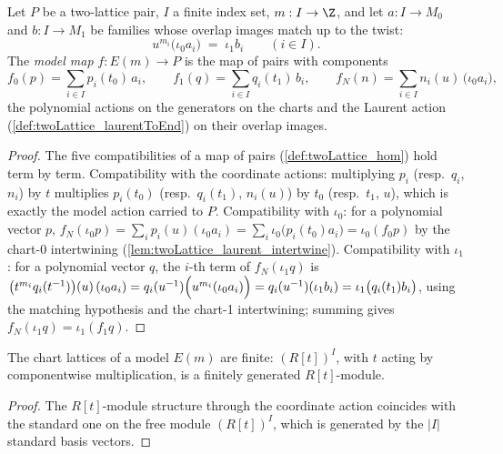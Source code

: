 \begin{definition}
  \label{def:twoLattice_modelHom}
  \leanok
  Let \(P\) be a two-lattice pair, \(I\) a finite index set, \(m : I \to \Z\), and let
  \(a : I \to M_0\) and \(b : I \to M_1\) be families whose overlap images match up to
  the twist:
  \[
    u^{m_i}\bigl(\iota_0 a_i\bigr) \;=\; \iota_1 b_i \qquad (i \in I).
  \]
  The \emph{model map} \(f : E(m) \to P\) is the map of pairs with components
  \[
    f_0(p) = \sum_{i \in I} p_i(t_0)\, a_i, \qquad
    f_1(q) = \sum_{i \in I} q_i(t_1)\, b_i, \qquad
    f_N(n) = \sum_{i \in I} n_i(u)\, \bigl(\iota_0 a_i\bigr) ,
  \]
  the polynomial actions on the generators on the charts and the Laurent action
  (\ref{def:twoLattice_laurentToEnd}) on their overlap images.
\end{definition}
\begin{proof}
  \leanok
  The five compatibilities of a map of pairs (\ref{def:twoLattice_hom}) hold term by
  term. Compatibility with the coordinate actions: multiplying \(p_i\) (resp.\ \(q_i\),
  \(n_i\)) by \(t\) multiplies \(p_i(t_0)\) (resp.\ \(q_i(t_1)\), \(n_i(u)\)) by
  \(t_0\) (resp.\ \(t_1\), \(u\)), which is exactly the model action carried to \(P\).
  Compatibility with \(\iota_0\): for a polynomial vector \(p\),
  \(f_N(\iota_0 p) = \sum_i p_i(u)(\iota_0 a_i) = \sum_i \iota_0\bigl(p_i(t_0)a_i\bigr)
  = \iota_0(f_0 p)\) by the chart-0 intertwining
  (\ref{lem:twoLattice_laurent_intertwine}). Compatibility with \(\iota_1\): for a
  polynomial vector \(q\), the \(i\)-th term of \(f_N(\iota_1 q)\) is
  \(\bigl(t^{m_i} q_i(t^{-1})\bigr)(u)\,(\iota_0 a_i) =
  q_i(u^{-1})\Bigl(u^{m_i}(\iota_0 a_i)\Bigr) = q_i(u^{-1})(\iota_1 b_i)
  = \iota_1\bigl(q_i(t_1) b_i\bigr)\), using the matching hypothesis and the chart-1
  intertwining; summing gives \(f_N(\iota_1 q) = \iota_1(f_1 q)\).
\end{proof}

\begin{lemma}
  \label{lem:moduleFinite_aeval_model}
  \leanok
  The chart lattices of a model \(E(m)\) are finite: \((R[t])^I\), with \(t\) acting by
  componentwise multiplication, is a finitely generated \(R[t]\)-module.
\end{lemma}
\begin{proof}
  \leanok
  The \(R[t]\)-module structure through the coordinate action coincides with the
  standard one on the free module \((R[t])^I\), which is generated by the \(|I|\)
  standard basis vectors.
\end{proof}

